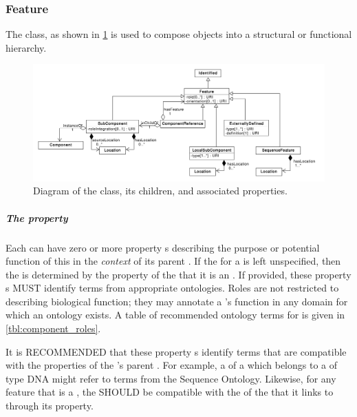\subsubsection{Feature}
\label{sec:Feature}

The  class, as shown in \ref{uml:subcomponent} is used to compose  objects into a structural or functional hierarchy. 

\begin{figure}[ht]
\begin{center}
\includegraphics[width=\textwidth]{uml/feature}
\caption[]{Diagram of the  class, its children, and associated properties.}
\label{uml:subcomponent}
\end{center}
\end{figure}

\subparagraph{The  property}\label{sec:role:F}

Each  can have zero or more  property s describing the purpose or potential function of this  in the \textit{context} of its parent .
If the  for a  is left unspecified, then the  is determined by the  property of the  that it is an . 
If provided, these  property s MUST identify terms from appropriate ontologies. Roles are not restricted to describing biological function; they may annotate a 's function in any domain for which an ontology exists.
A table of recommended ontology terms for  is given in \ref{tbl:component_roles}.

It is RECOMMENDED that these  property s identify terms that are compatible with the  properties of the 's parent .
For example, a  of a  which belongs to a  of type DNA might refer to terms from the Sequence Ontology. 
Likewise, for any feature that is a , the  SHOULD be compatible with the  of the  that it links to through its  property.


